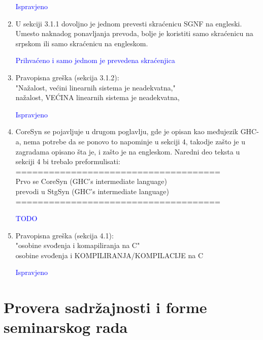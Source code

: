 \documentclass[a4paper]{report}
\newcommand{\odgovor}[1]{\textcolor{blue}{#1}}
\begin{document}
\begin{enumerate}
		\odgovor{Ispravjeno}
		
		\item U sekciji 3.1.1 dovoljno je jednom prevesti skraćenicu SGNF na engleski. Umesto naknadog ponavljanja prevoda, bolje je koristiti samo skraćenicu na srpskom ili samo skraćenicu na engleskom.
		
		\odgovor{Prihvaćeno i samo jednom je prevedena skraćenjica}
		
		\item Pravopisna greška (sekcija 3.1.2):\\	
		"Nažalost, većini linearnih sistema je neadekvatna,"\\
		nažalost, VEĆINA linearnih sistema je neadekvatna,
		
		\odgovor{Ispravjeno}
		
		\item CoreSyn se pojavljuje u drugom poglavlju, gde je opisan kao međujezik GHC-a, nema potrebe da se ponovo to napominje u sekciji 4, takodje zašto je u zagradama opisano šta je, i zašto je na engleskom. Naredni deo teksta u sekciji 4 bi trebalo preformulisati:\\
		=====================================\\
		Prvo se CoreSyn (GHC's intermediate language)\\
		prevodi u StgSyn (GHC's intermediate language)\\
		=====================================
		
		\odgovor{TODO}
		
		\item Pravopisna greška (sekcija 4.1):\\
		"osobine svođenja i komapiliranja na C"\\
		osobine svođenja i KOMPILIRANJA/KOMPILACIJE na C
		
		\odgovor{Ispravjeno}
		
	\end{enumerate}
	
	
	
	
	
	\section{Provera sadržajnosti i forme seminarskog rada}
	
\end{document}
